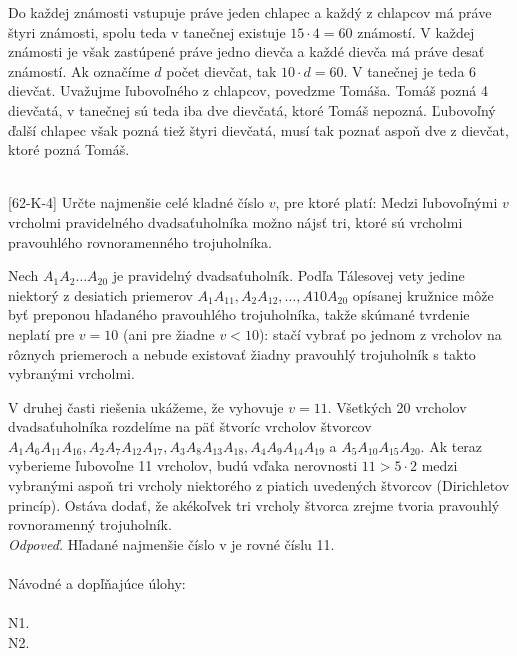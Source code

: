 \rieh Do každej známosti vstupuje práve jeden chlapec a každý z chlapcov má práve štyri známosti, spolu teda v tanečnej existuje $15 \cdot 4 = 60$ známostí. V každej známosti je však zastúpené práve jedno dievča a každé dievča má práve desať známostí. Ak označíme $d$ počet dievčat, tak $10 \cdot d = 60$. V tanečnej je teda 6 dievčat. Uvažujme ľubovoľného z chlapcov, povedzme Tomáša. Tomáš pozná 4 dievčatá, v tanečnej sú teda iba dve dievčatá, ktoré Tomáš nepozná. Ľubovoľný ďalší chlapec však pozná tiež štyri dievčatá, musí tak poznať aspoň dve z dievčat, ktoré pozná Tomáš.\\
\\
\begin{tcolorbox}[breakable,notitle,boxrule=0pt,colback=light-gray,colframe=light-gray]\ul [62-K-4] Určte najmenšie celé kladné číslo $v$, pre ktoré platí: Medzi ľubovoľnými $v$ vrcholmi pravidelného dvadsaťuholníka možno nájsť tri, ktoré sú vrcholmi pravouhlého rovnoramenného trojuholníka.

\end{tcolorbox}

\rieh Nech $A_1 A_2 \ldots A_{20}$ je pravidelný dvadsaťuholník. Podľa Tálesovej vety jedine niektorý z desiatich priemerov $A_1 A_{11}, A_2 A_{12}, \ldots, A{10}A_{20}$ opísanej kružnice môže byť
preponou hľadaného pravouhlého trojuholníka, takže skúmané tvrdenie neplatí pre $v = 10$ (ani pre žiadne $v < 10$): stačí vybrať po jednom z vrcholov na rôznych priemeroch a nebude existovať žiadny pravouhlý trojuholník s takto vybranými vrcholmi.

V druhej časti riešenia ukážeme, že vyhovuje $v = 11$. Všetkých 20 vrcholov dvadsaťuholníka rozdelíme na päť štvoríc vrcholov štvorcov $A_1 A_6 A_{11} A_{16}, A_2 A_7 A_{12} A_{17}, A_3 A_8 A_{13} A_{18}, A_4 A_9 A_{14} A_{19}$ a $A_5 A_{10} A_{15} A_{20}$. Ak teraz vyberieme ľubovoľne 11 vrcholov, budú vďaka nerovnosti $11 > 5\cdot 2$ medzi vybranými aspoň tri vrcholy niektorého z piatich uvedených štvorcov (Dirichletov princíp). Ostáva dodať, že akékoľvek tri vrcholy štvorca zrejme tvoria pravouhlý rovnoramenný trojuholník.\\
\textit{Odpoveď.} Hľadané najmenšie číslo v je rovné číslu 11.\\
\\

Návodné a dopľňajúce úlohy:\\
\\
N1.
\\
N2.
\\
\\


